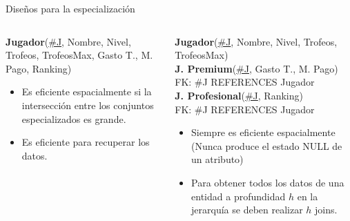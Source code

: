 \begin{frame}{Dise\~nos para la especializaci\'on}
    \begin{columns}[T]
        \begin{column}{0.48\linewidth}

            \begin{scriptsize}
                
                \textbf{Jugador}(\underline{\#J}, Nombre, Nivel, Trofeos, TrofeosMax, Gasto T., M. Pago, Ranking)\\[2mm]
            \end{scriptsize}

            \vspace{20mm}

            \begin{itemize}
                \item Es eficiente espacialmente si la intersecci\'on entre los conjuntos especializados es grande.
                \item Es eficiente para recuperar los datos.
            \end{itemize}
        \end{column}

        \begin{column}{0.48\linewidth}
            \begin{scriptsize}
                
                \textbf{Jugador}(\underline{\#J}, Nombre, Nivel, Trofeos, TrofeosMax)\\[2mm]
                \textbf{J. Premium}(\underline{\#J}, Gasto T., M. Pago)\\[1mm]
                \hspace{4mm} FK: \#J REFERENCES Jugador\\[2mm]
                \textbf{J. Profesional}(\underline{\#J}, Ranking)\\[1mm]
                \hspace{4mm} FK: \#J REFERENCES Jugador
            \end{scriptsize}
            
            \vspace{3mm}

            \begin{itemize}
                \item Siempre es eficiente espacialmente (Nunca produce el estado NULL de un atributo)
                \item Para obtener todos los datos de una entidad a profundidad $h$ en la jerarqu\'ia se
                deben realizar $h$ joins.
            \end{itemize}
        \end{column}
        
    \end{columns}
\end{frame}



